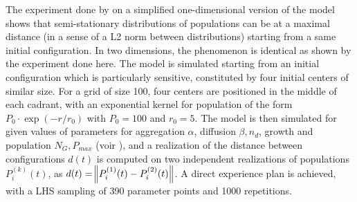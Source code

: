 \documentclass[11pt]{article}
\begin{document}
The experiment done by \cite{raimbault2018calibration} on a simplified one-dimensional version of the model shows that semi-stationary distributions of populations can be at a maximal distance (in a sense of a L2 norm between distributions) starting from a same initial configuration. In two dimensions, the phenomenon is identical as shown by the experiment done here. The model is simulated starting from an initial configuration which is particularly sensitive, constituted by four initial centers of similar size. For a grid of size 100, four centers are positioned in the middle of each cadrant, with an exponential kernel for population of the form $P_0 \cdot \exp \left(-r/r_0\right)$ with $P_0 = 100$ and $r_0 = 5$. The model is then simulated for given values of parameters for aggregation $\alpha$, diffusion $\beta, n_d$, growth and population $N_G, P_{max}$ (voir \cite{raimbault2018calibration}), and a realization of the distance between configurations $d(t)$ is computed on two independent realizations of populations $P^{(k)}_i(t)$, as $d(t)=\norm{P^{(1)}_i(t) - P^{(2)}_i(t)}$. A direct experience plan is achieved, with a LHS sampling of 390 parameter points and 1000 repetitions.


\end{document}
